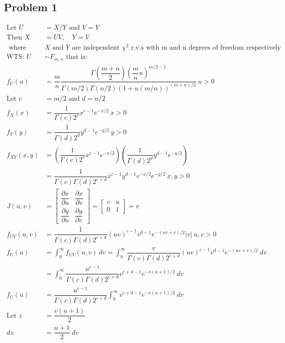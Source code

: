 \documentclass{article}
\begin{document}
\begin{flushleft}
\section*{Problem 1}
\begin{align*}
\text{Let } U&= X/Y \text{ and } V=Y\\
\text{Then } X&=UV, \quad Y=V\\
\text{ where } &X \text{ and } Y \text{ are independent } \chi^2 \text{ r.v.s with m and n degrees of freedom respectively}\\
\text{WTS: } U& \sim F_{m,n} \text{ that is:}\\
f_U(u)&=\dfrac{m}{n}\dfrac{\Gamma(\dfrac{m+n}{2})(\dfrac{m}{n}u)^{m/2-1}}{\Gamma(m/2)\Gamma(n/2)(1+u(m/n))^{(m+n)/2}} \ u>0\\
\text{Let } c&=m/2 \text{ and } d=n/2\\
f_X(x)&=\dfrac{1}{\Gamma(c)2^c}x^{c-1}e^{-x/2} \ x>0\\
f_Y(y)&=\dfrac{1}{\Gamma(d)2^d}y^{d-1}e^{-y/2} \ y>0\\
f_{XY}(x,y)&=\left(\dfrac{1}{\Gamma(c)2^c}x^{c-1}e^{-x/2}\right) \left(\dfrac{1}{\Gamma(d)2^d}y^{d-1}e^{-y/2}\right)\\
&=\dfrac{1}{\Gamma(c)\Gamma(d)2^{c+d}}x^{c-1}y^{d-1}e^{-x/2}e^{-y/2} \ x,y>0\\
J(u,v)&=
\begin{bmatrix}
\dfrac{\partial x}{\partial u} & 
\dfrac{\partial x}{\partial v}\\ 
\dfrac{\partial y}{\partial u} &
\dfrac{\partial y}{\partial v} 
\end{bmatrix}
= \begin{bmatrix}
v & u \\
0 & 1
\end{bmatrix}
=v\\
f_{UV}(u,v)&=\dfrac{1}{\Gamma(c)\Gamma(d)2^{c+d}}(uv)^{c-1}v^{d-1}e^{-(uv+v)/2}|v| \ u,v>0\\
f_U(u)&=\int_{0}^{\infty}f_{UV}(u,v) \ dv=\int_{0}^{\infty}\dfrac{v}{\Gamma(c)\Gamma(d)2^{c+d}}(uv)^{c-1}v^{d-1}e^{-(uv+v)/2} \ dv\\
&=\int_{0}^{\infty}\dfrac{u^{c-1}}{\Gamma(c)\Gamma(d)2^{c+d}}v^{c+d-1}e^{-v(u+1)/2} \ dv\\
f_U(u)&=\dfrac{u^{c-1}}{\Gamma(c)\Gamma(d)2^{c+d}}\int_{0}^{\infty}v^{c+d-1}e^{-v(u+1)/2} \ dv\\
\text{Let } z&=\dfrac{v(u+1)}{2}\\
dz&=\dfrac{u+1}{2} \ dv\\

\end{align*}
\end{flushleft}
\end{document}
